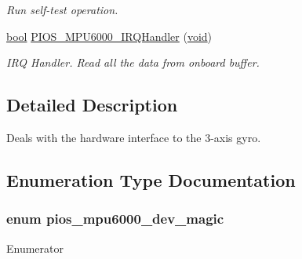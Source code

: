 \begin{DoxyCompactItemize}
\begin{DoxyCompactList}\small\item\em Run self-\/test operation. \end{DoxyCompactList}\item 
\hyperlink{group___exported__types_gaf6a258d8f3ee5206d682d799316314b1}{bool} \hyperlink{group___p_i_o_s___m_p_u6000_ga4c18e34de1623b28467e377fce4ace05}{P\-I\-O\-S\-\_\-\-M\-P\-U6000\-\_\-\-I\-R\-Q\-Handler} (\hyperlink{group___n_a_m_e_ga18028b8badbf1ea7e704ccac3c488e82}{void})
\begin{DoxyCompactList}\small\item\em I\-R\-Q Handler. Read all the data from onboard buffer. \end{DoxyCompactList}\end{DoxyCompactItemize}


\subsection{Detailed Description}
Deals with the hardware interface to the 3-\/axis gyro. 

\subsection{Enumeration Type Documentation}
\hypertarget{group___p_i_o_s___m_p_u6000_gacec1373b8d76d996eacbadde2698c1ee}{
\subsubsection[{pios\-\_\-mpu6000\-\_\-dev\-\_\-magic}]{\setlength{\rightskip}{0pt plus 5cm}enum {\bf pios\-\_\-mpu6000\-\_\-dev\-\_\-magic}}}\label{group___p_i_o_s___m_p_u6000_gacec1373b8d76d996eacbadde2698c1ee}
\begin{Desc}
\item[Enumerator]\par
\begin{description}
\item[{\em 
\hypertarget{group___p_i_o_s___m_p_u6000_ggacec1373b8d76d996eacbadde2698c1eea5819766babadd675342ed58f91a0d1fd}{P\-I\-O\-S\-\_\-\-M\-P\-U6000\-\_\-\-D\-E\-V\-\_\-\-M\-A\-G\-I\-C}\label{group___p_i_o_s___m_p_u6000_ggacec1373b8d76d996eacbadde2698c1eea5819766babadd675342ed58f91a0d1fd}
}]\end{description}
\end{Desc}


